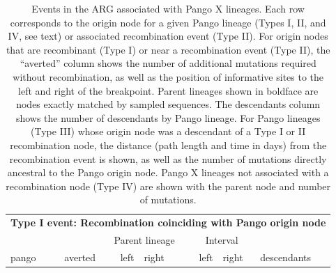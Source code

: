 \documentclass[12pt]{article}
\begin{document}
\begin{table}
\caption{
\footnotesize{
Events in the ARG associated with Pango X lineages.
Each row corresponds to the origin node for a given Pango lineage (Types I, II,
and IV, see text) or associated recombination event (Type II). For origin nodes
that are recombinant (Type I) or near a recombination event (Type II), the
``averted'' column shows the number of additional mutations required without
recombination, as well as the position of informative sites to the left and
right of the breakpoint. Parent lineages shown in boldface are nodes exactly
matched by sampled sequences. The descendants column shows the number of
descendants by Pango lineage. For Pango lineages (Type III) whose origin node
was a descendant of a Type I or II recombination node, the distance (path
length and time in days) from the recombination event is shown, as well as the
number of mutations directly ancestral to the Pango origin node. Pango X
lineages not associated with a recombination node (Type IV) are shown with the
parent node and number of mutations.
}
}
\label{tab:pango_x_lineages}
\begin{scriptsize}
\singlespacing
\begin{tabular}{lrrlrll}
\toprule
\multicolumn{7}{l}{\textbf{Type I event: Recombination coinciding with Pango
origin node}}\\
&&\multicolumn{2}{c}{Parent lineage} & \multicolumn{2}{c}{Interval}\\
pango & averted & left & right & left & right & descendants \\
\midrule


\end{tabular}
\end{scriptsize}
\end{table}
\end{document}
